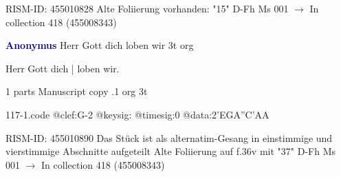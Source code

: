 \documentclass[twocolumn]{book}
\begin{document}
\newline RISM-ID: 455010828
\newline Alte Foliierung vorhanden: "15"
\newline D-Fh  Ms 001
\newline $\rightarrow$ In collection 418 (455008343)

\newline \par \vspace{7pt} \textcolor{darkblue}{\textbf{Anonymus  }}
\newline Herr Gott dich loben wir  3t  
\newline org
\newline \begin{itshape}[f.36v, at left:] Herr Gott dich | loben wir.\end{itshape} 
\newline \textcolor{darkblue}{}  1 parts  
\newline Manuscript copy
.1  org  3t  
\begin{filecontents*}{117-1.code}
@clef:G-2
@keysig:
@timesig:0
@data:2'EGA''C'AA
\end{filecontents*}
\newline
%

\newline RISM-ID: 455010890
\newline Das Stück ist als alternatim-Gesang in einstimmige und vierstimmige Abschnitte aufgeteilt
\newline Alte Foliierung auf f.36v mit "37"
\newline D-Fh  Ms 001
\newline $\rightarrow$ In collection 418 (455008343)
\end{document}
